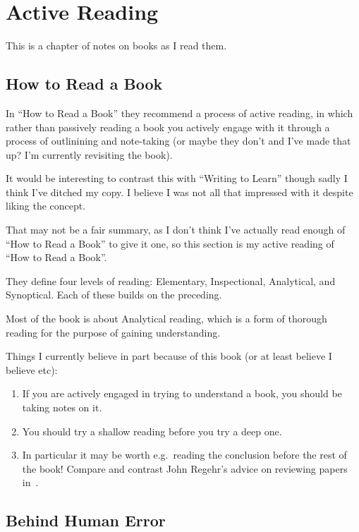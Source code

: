 \chapter{Active Reading}

This is a chapter of notes on books as I read them.

\section{How to Read a Book}

In ``How to Read a Book''\cite{ReadABook} they recommend a process of active reading,
in which rather than passively reading a book you actively engage with it through a process of outlinining and note-taking (or maybe they don't and I've made that up? I'm currently revisiting the book).

It would be interesting to contrast this with ``Writing to Learn''\cite{WritingToLearn} though sadly I think I've ditched my copy.
I believe I was not all that impressed with it despite liking the concept.

That may not be a fair summary, as I don't think I've actually read enough of ``How to Read a Book'' to give it one,
so this section is my active reading of ``How to Read a Book''.

They define four levels of reading:
Elementary, Inspectional, Analytical, and Synoptical.
Each of these builds on the preceding.

Most of the book is about Analytical reading,
which is a form of thorough reading for the purpose of gaining understanding.

Things I currently believe in part because of this book (or at least believe I believe etc):

\begin{enumerate}
\item If you are actively engaged in trying to understand a book, you should be taking notes on it.
\item You should try a shallow reading before you try a deep one.
\item In particular it may be worth e.g.\ reading the conclusion before the rest of the book!
Compare and contrast John Regehr's advice on reviewing papers in~\cite{ReviewingPapers}.
\end{enumerate}

\section{Behind Human Error}


